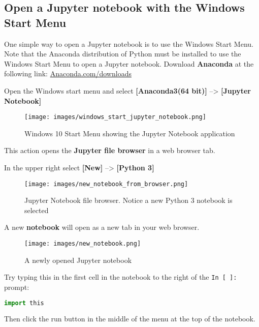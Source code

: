 \documentclass{book}
\makeatletter
\def\maxwidth{\ifdim\Gin@nat@width>\linewidth\linewidth
\else\Gin@nat@width\fi}
\let\Oldincludegraphics\includegraphics
\renewcommand{\includegraphics}[1]{\Oldincludegraphics[width=.8\maxwidth]{#1}}
\newcommand{\passthrough}[1]{#1}
\makeatother
\begin{document}
    
        \hypertarget{open-a-jupyter-notebook-with-the-windows-start-menu}{%
\subsection{Open a Jupyter notebook with the Windows Start
Menu}\label{open-a-jupyter-notebook-with-the-windows-start-menu}}
    




    
        One simple way to open a Jupyter notebook is to use the Windows Start
Menu. Note that the Anaconda distribution of Python must be installed to
use the Windows Start Menu to open a Jupyter notebook. Download
\textbf{Anaconda} at the following link:
\href{https://www.anaconda.com/download/}{Anaconda.com/downloads}

Open the Windows start menu and select \textbf{{[}Anaconda3(64 bit){]}}
--\textgreater{} \textbf{{[}Jupyter Notebook{]}}

\begin{figure}
\centering
\texttt{[image: images/windows\_start\_jupyter\_notebook.png]}
\caption{Windows 10 Start Menu showing the Jupyter Notebook application}
\end{figure}

This action opens the \textbf{Jupyter file browser} in a web browser
tab.

In the upper right select \textbf{{[}New{]}} --\textgreater{}
\textbf{{[}Python 3{]}}

\begin{figure}
\centering
\texttt{[image: images/new\_notebook\_from\_browser.png]}
\caption{Jupyter Notebook file browser. Notice a new Python 3 notebook
is selected}
\end{figure}

A new \textbf{notebook} will open as a new tab in your web browser.

\begin{figure}
\centering
\texttt{[image: images/new\_notebook.png]}
\caption{A newly opened Jupyter notebook}
\end{figure}

Try typing this in the first cell in the notebook to the right of the
\passthrough{\lstinline!In [ ]:!} prompt:

\begin{lstlisting}[language=Python]
import this
\end{lstlisting}

Then click the run button in the middle of the menu at the top of the
notebook.
\end{document}
